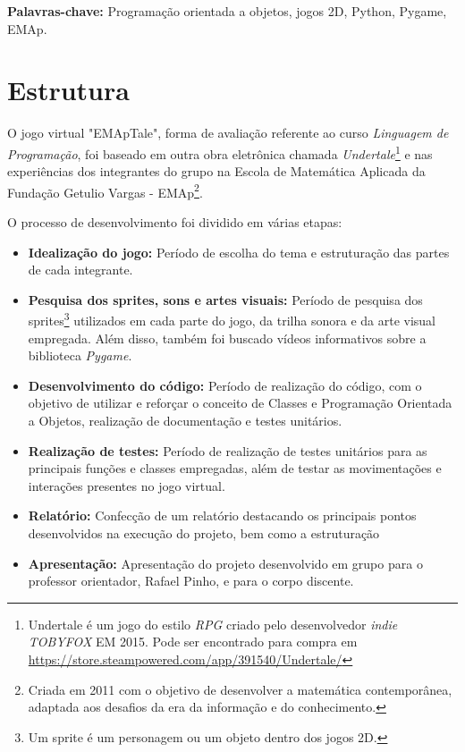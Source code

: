 \documentclass[a4paper, 12pt, twoside]{article}
\begin{document}
\noindent \textbf{Palavras-chave:} Programação orientada a objetos, jogos 2D, Python, Pygame, EMAp.

\newpage

\section{Estrutura}

O jogo virtual "EMApTale", forma de avaliação referente ao curso \textit{Linguagem de Programação}, foi baseado em outra obra eletrônica chamada \textit{Undertale}\footnote{Undertale é um jogo do estilo \textit{RPG} criado pelo desenvolvedor \textit{indie} \textit{TOBYFOX} EM 2015. Pode ser encontrado para compra em \url{https://store.steampowered.com/app/391540/Undertale/}} e nas experiências dos integrantes do grupo na Escola de Matemática Aplicada da Fundação Getulio Vargas - EMAp\footnote{Criada em 2011 com o objetivo de desenvolver a matemática contemporânea, adaptada aos desafios da era da informação e do conhecimento.}.

O processo de desenvolvimento foi dividido em várias etapas: 
\begin{itemize}[label=-]
    \item \textbf{Idealização do jogo: }Período de escolha do tema e estruturação das partes de cada integrante.
    \item \textbf{Pesquisa dos sprites, sons e artes visuais: }Período de pesquisa dos sprites\footnote{Um sprite é um personagem ou um objeto dentro dos jogos 2D.} utilizados em cada parte do jogo, da trilha sonora e da arte visual empregada. Além disso, também foi buscado vídeos informativos sobre a biblioteca \textit{Pygame}.
    \item \textbf{Desenvolvimento do código: }Período de realização do código, com o objetivo de utilizar e reforçar o conceito de Classes e Programação Orientada a Objetos, realização de documentação e testes unitários.
    \item \textbf{Realização de testes: }Período de realização de testes unitários para as principais funções e classes empregadas, além de testar as movimentações e interações presentes no jogo virtual.
    \item \textbf{Relatório: }Confecção de um relatório destacando os principais pontos desenvolvidos na execução do projeto, bem como a estruturação 
    \item \textbf{Apresentação: }Apresentação do projeto desenvolvido em grupo para o professor orientador, Rafael Pinho, e para o corpo discente.
\end{itemize}
\end{document}
